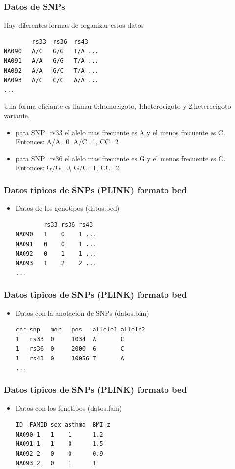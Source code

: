 \documentclass{beamer}\usepackage[]{graphicx}\usepackage[]{color}
\begin{document}
\begin{frame}[fragile]
\frametitle{Datos de SNPs}

Hay diferentes formas de organizar estos datos
 
\begin{verbatim}
        rs33  rs36  rs43
NA090   A/C   G/G   T/A ...
NA091   A/A   G/G   T/A ...
NA092   A/A   G/C   T/A ...
NA093   A/C   C/C   A/A ...
...
\end{verbatim}
Una forma eficiante es llamar 0:homocigoto, 1:heterocigoto y 2:heterocigoto variante.

\begin{itemize}
\item para SNP=rs33 el alelo mas frecuente es A y el menos frecuente es C. \newline Entonces:  A/A=0, A/C=1, CC=2
\item para SNP=rs36 el alelo mas frecuente es G y el menos frecuente es C. \newline Entonces:  G/G=0, G/C=1, CC=2

\end{itemize}
\end{frame}



\begin{frame}[fragile]
\frametitle{Datos tipicos de SNPs (PLINK) formato bed}
\begin{itemize}
\item Datos de los genotipos (datos.bed)
\begin{verbatim}
        rs33 rs36 rs43
NA090   1    0    1 ...
NA091   0    0    1 ...
NA092   0    1    1 ...
NA093   1    2    2 ...
...
\end{verbatim}
\end{itemize}
\end{frame}

\begin{frame}[fragile]
\frametitle{Datos tipicos de SNPs (PLINK) formato bed}
\begin{itemize}
\item Datos con la anotacion de SNPs (datos.bim)
\begin{verbatim}
chr snp   mor   pos   allele1 allele2
1   rs33  0     1034  A       C
1   rs36  0     2000  G       C
1   rs43  0     10056 T       A 
...
\end{verbatim}
\end{itemize}
\end{frame}

\begin{frame}[fragile]
\frametitle{Datos tipicos de SNPs (PLINK) formato bed}
\begin{itemize}
\item Datos con los fenotipos (datos.fam)
\begin{verbatim}
ID  FAMID sex asthma  BMI-z
NA090 1   1    1      1.2
NA091 1   1    0      1.5
NA092 2   0    0      0.9
NA093 2   0    1      1
\end{verbatim}

\end{itemize}
\end{frame}
\end{document}
